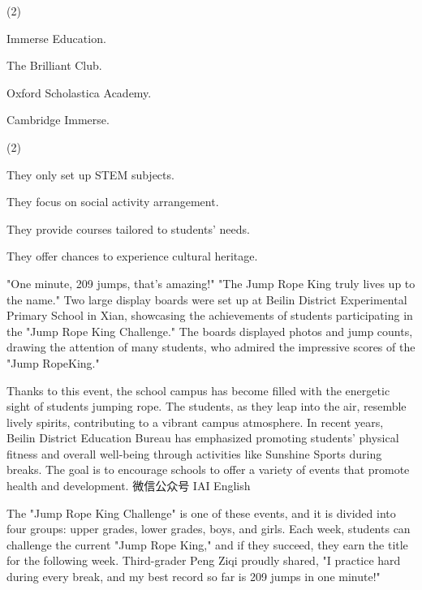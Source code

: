 \documentclass{英语试卷}
\begin{document}
\begin{choices}(2)
  \item Immerse Education.
  \item The Brilliant Club.
  \item Oxford Scholastica Academy.
  \item Cambridge Immerse.
\end{choices}
\begin{choices}(2)
  \item They only set up STEM subjects.
  \item They focus on social activity arrangement.
  \item They provide courses tailored to students' needs.
  \item They offer chances to experience cultural heritage.
\end{choices}
\par "One minute, 209 jumps, that's amazing!" "The Jump Rope King truly lives up to the name." Two large display boards were set up at Beilin District Experimental Primary School in Xian, showcasing the achievements of students participating in the "Jump Rope King Challenge." The boards displayed photos and jump counts, drawing the attention of many students, who admired the impressive scores of the "Jump RopeKing."\par
\par Thanks to this event, the school campus has become filled with the energetic sight of students jumping rope. The students, as they leap into the air, resemble lively spirits, contributing to a vibrant campus atmosphere. In recent years, Beilin District Education Bureau has emphasized promoting students' physical fitness and overall well-being through activities like Sunshine Sports during breaks. The goal is to encourage schools to offer a variety of events that promote health and development. 微信公众号 IAI English\par
\par The "Jump Rope King Challenge" is one of these events, and it is divided into four groups: upper grades, lower grades, boys, and girls. Each week, students can challenge the current "Jump Rope King," and if they succeed, they earn the title for the following week. Third-grader Peng Ziqi proudly shared, "I practice hard during every break, and my best record so far is 209 jumps in one minute!"\par
\end{document}
